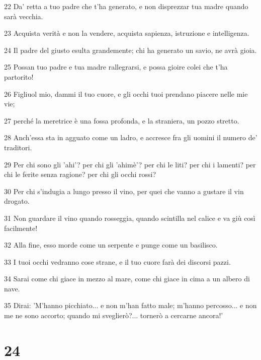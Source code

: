 \par 22 Da' retta a tuo padre che t'ha generato, e non disprezzar tua madre quando sarà vecchia.
\par 23 Acquista verità e non la vendere, acquista sapienza, istruzione e intelligenza.
\par 24 Il padre del giusto esulta grandemente; chi ha generato un savio, ne avrà gioia.
\par 25 Possan tuo padre e tua madre rallegrarsi, e possa gioire colei che t'ha partorito!
\par 26 Figliuol mio, dammi il tuo cuore, e gli occhi tuoi prendano piacere nelle mie vie;
\par 27 perché la meretrice è una fossa profonda, e la straniera, un pozzo stretto.
\par 28 Anch'essa sta in agguato come un ladro, e accresce fra gli uomini il numero de' traditori.
\par 29 Per chi sono gli 'ahi'? per chi gli 'ahimè'? per chi le liti? per chi i lamenti? per chi le ferite senza ragione? per chi gli occhi rossi?
\par 30 Per chi s'indugia a lungo presso il vino, per quei che vanno a gustare il vin drogato.
\par 31 Non guardare il vino quando rosseggia, quando scintilla nel calice e va giù così facilmente!
\par 32 Alla fine, esso morde come un serpente e punge come un basilisco.
\par 33 I tuoi occhi vedranno cose strane, e il tuo cuore farà dei discorsi pazzi.
\par 34 Sarai come chi giace in mezzo al mare, come chi giace in cima a un albero di nave.
\par 35 Dirai: 'M'hanno picchiato... e non m'han fatto male; m'hanno percosso... e non me ne sono accorto; quando mi sveglierò?... tornerò a cercarne ancora!'

\chapter{24}

